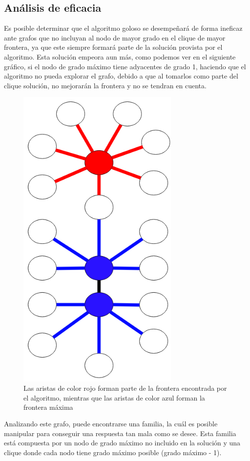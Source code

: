 \documentclass[a4paper, 10pt, twoside]{article}
\begin{document}
\subsection{Análisis de eficacia}
Es posible determinar que el algoritmo goloso se desempeñará de forma ineficaz ante grafos que no incluyan al nodo de mayor grado en el clique de mayor frontera, ya que este siempre formará parte de la solución provista por el algoritmo. Esta solución empeora aun más, como podemos ver en el siguiente gráfico, si el nodo de grado máximo tiene adyacentes de grado 1, haciendo que el algoritmo no pueda explorar el grafo, debido a que al tomarlos como parte del clique solución, no mejorarán la frontera y no se tendran en cuenta.

\begin{figure}[H]
\includegraphics[width=80mm]{ejemploErrorGoloso.png}
\caption{Las aristas de color rojo forman parte de la frontera encontrada por el algoritmo, mientras que las aristas de color azul forman la frontera máxima}
\label{overflow}
\end{figure}

Analizando este grafo, puede encontrarse una familia, la cuál es posible manipular para conseguir una respuesta tan mala como se desee. Esta familia está compuesta por un nodo de grado máximo no incluido en la solución y una clique donde cada nodo tiene grado máximo posible (grado máximo - 1).
\end{document}
